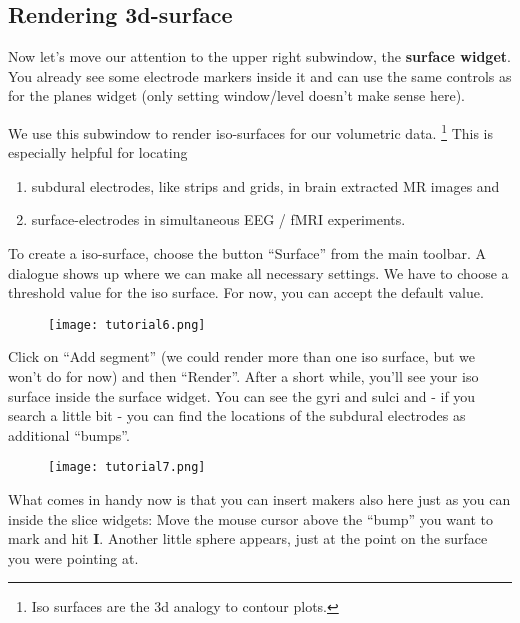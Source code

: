 \documentclass[letterpaper,10pt,english]{sphinxmanual}
\begin{document}
\subsection{Rendering 3d-surface}
\label{tutorial:rendering-3d-surface}
Now let's move our attention to the upper right subwindow, the \textbf{surface widget}.
You already see some electrode markers inside it and can use the same controls as
for the planes widget (only setting window/level doesn't make sense here).

We use this subwindow to render iso-surfaces for our volumetric data. \footnote{
Iso surfaces are the 3d analogy to contour plots.
}
This is especially helpful for locating
\begin{enumerate}
\item {} 
subdural electrodes, like strips and grids, in brain extracted MR images and

\item {} 
surface-electrodes in simultaneous EEG / fMRI experiments.

\end{enumerate}

To create a iso-surface, choose the button ``Surface'' from the main toolbar.
A dialogue shows up where we can make all necessary settings. We have to choose
a threshold value for the iso surface. For now, you can accept the default value.
\begin{figure}[htbp]
\centering

\texttt{[image: tutorial6.png]}
\end{figure}

Click on ``Add segment'' (we could render more than one iso surface, but we won't do
for now) and then ``Render''. After a short while, you'll see your iso surface inside
the surface widget. You can see the gyri and sulci and - if you search a little bit -
you can find the locations of the subdural electrodes as additional ``bumps''.
\begin{figure}[htbp]\begin{flushright}

\texttt{[image: tutorial7.png]}
\end{flushright}\end{figure}

What comes in handy now is that you can insert makers also here just as you can inside
the slice widgets: Move the mouse cursor above the ``bump'' you want to mark and hit \textbf{I}.
Another little sphere appears, just at the point on the surface you were pointing at.
\end{document}
